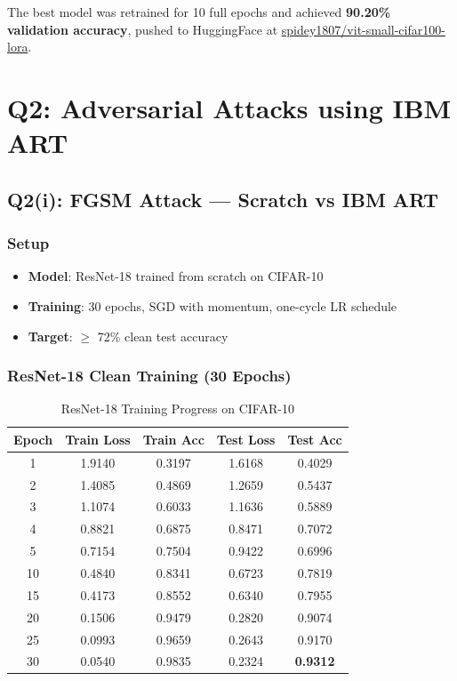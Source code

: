 \documentclass[12pt,a4paper]{article}
\begin{document}
The best model was retrained for 10 full epochs and achieved \textbf{90.20\% validation accuracy}, pushed to HuggingFace at \href{https://huggingface.co/spidey1807/vit-small-cifar100-lora}{spidey1807/vit-small-cifar100-lora}.

\newpage

\section{Q2: Adversarial Attacks using IBM ART}

\subsection{Q2(i): FGSM Attack — Scratch vs IBM ART}

\subsubsection{Setup}

\begin{itemize}
    \item \textbf{Model}: ResNet-18 trained from scratch on CIFAR-10
    \item \textbf{Training}: 30 epochs, SGD with momentum, one-cycle LR schedule
    \item \textbf{Target}: $\geq$ 72\% clean test accuracy
\end{itemize}

\subsubsection{ResNet-18 Clean Training (30 Epochs)}

\begin{table}[H]
\centering
\caption{ResNet-18 Training Progress on CIFAR-10}
\begin{tabular}{ccccc}
\toprule
Epoch & Train Loss & Train Acc & Test Loss & Test Acc \\
\midrule
1  & 1.9140 & 0.3197 & 1.6168 & 0.4029 \\
2  & 1.4085 & 0.4869 & 1.2659 & 0.5437 \\
3  & 1.1074 & 0.6033 & 1.1636 & 0.5889 \\
4  & 0.8821 & 0.6875 & 0.8471 & 0.7072 \\
5  & 0.7154 & 0.7504 & 0.9422 & 0.6996 \\
10 & 0.4840 & 0.8341 & 0.6723 & 0.7819 \\
15 & 0.4173 & 0.8552 & 0.6340 & 0.7955 \\
20 & 0.1506 & 0.9479 & 0.2820 & 0.9074 \\
25 & 0.0993 & 0.9659 & 0.2643 & 0.9170 \\
30 & 0.0540 & 0.9835 & 0.2324 & \textbf{0.9312} \\
\bottomrule
\end{tabular}
\end{table}
\end{document}
